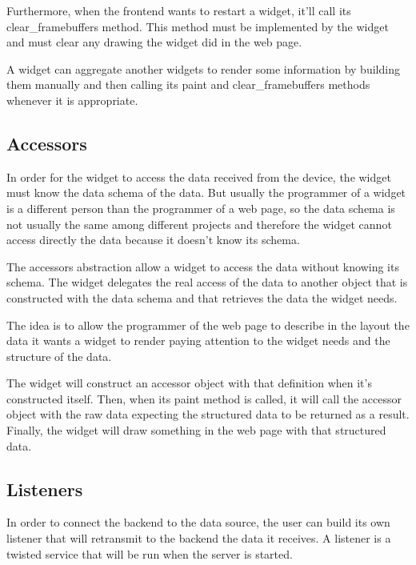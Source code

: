 \documentclass[12pt]{article}
\begin{document}
            Furthermore, when the frontend wants to restart a widget, it'll
            call its clear\_framebuffers method. This method must be implemented
            by the widget and must clear any drawing the widget did in the web
            page.

            A widget can aggregate another widgets to render some information by
            building them manually and then calling its paint and
            clear\_framebuffers methods whenever it is appropriate.

        \subsection{Accessors}
            In order for the widget to access the data received from the device,
            the widget must know the data schema of the data. But usually the
            programmer of a widget is a different person than the programmer of
            a web page, so the data schema is not usually the same among
            different projects and therefore the widget cannot access directly
            the data because it doesn't know its schema.

            The accessors abstraction allow a widget to access the data without
            knowing its schema. The widget delegates the real access of the data
            to another object that is constructed with the data schema and that
            retrieves the data the widget needs.

            The idea is to allow the programmer of the web page to describe in
            the layout the data it wants a widget to render paying attention to
            the widget needs and the structure of the data.
            
            The widget will construct an accessor object with that definition
            when it's constructed itself. Then, when its paint method is called,
            it will call the accessor object with the raw data expecting the
            structured data to be returned as a result. Finally, the widget will
            draw something in the web page with that structured data.

        \subsection{Listeners}
            In order to connect the backend to the data source, the user can
            build its own listener that will retransmit to the backend the data
            it receives. A listener is a twisted service that will be run when
            the server is started.
\end{document}
